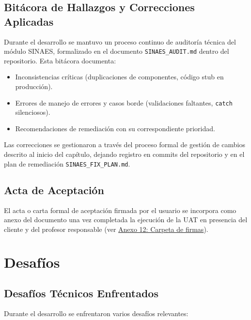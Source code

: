 \subsection{Bitácora de Hallazgos y Correcciones Aplicadas}

Durante el desarrollo se mantuvo un proceso continuo de auditoría técnica del módulo SINAES, formalizado en el documento \texttt{SINAES\_AUDIT.md} dentro del repositorio. Esta bitácora documenta:

\begin{itemize}
    \item Inconsistencias críticas (duplicaciones de componentes, código stub en producción).
    \item Errores de manejo de errores y casos borde (validaciones faltantes, \texttt{catch} silenciosos).
    \item Recomendaciones de remediación con su correspondiente prioridad.
\end{itemize}

Las correcciones se gestionaron a través del proceso formal de gestión de cambios descrito al inicio del capítulo, dejando registro en commits del repositorio y en el plan de remediación \texttt{SINAES\_FIX\_PLAN.md}.

\subsection{Acta de Aceptación}

El acta o carta formal de aceptación firmada por el usuario se incorpora como anexo del documento una vez completada la ejecución de la UAT en presencia del cliente y del profesor responsable (ver \hyperref[anexo:carpeta_firmas]{Anexo 12: Carpeta de firmas}).

\section{Desafíos}

\subsection{Desafíos Técnicos Enfrentados}

Durante el desarrollo se enfrentaron varios desafíos relevantes:

